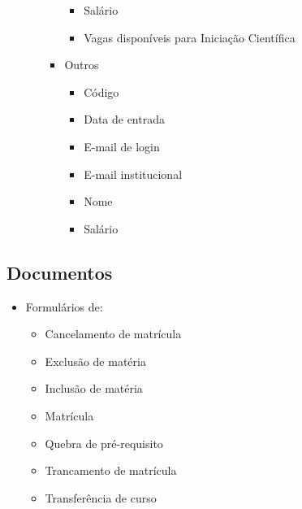 \begin{itemize}
\begin{itemize}
\begin{itemize}
\begin{itemize}
                            \item Salário
                            \item Vagas disponíveis para Iniciação Científica
                        \end{itemize}
                        \item Outros
                        \begin{itemize}
                            \item Código
                            \item Data de entrada
                            \item E-mail de login
                            \item E-mail institucional
                            \item Nome
                            \item Salário
                        \end{itemize}
                    \end{itemize}
                \end{itemize}
            \end{itemize}
    
        \subsection{Documentos}
            \begin{itemize}
                \item Formulários de:
                \begin{itemize}
                    \item Cancelamento de matrícula
                    \item Exclusão de matéria
                    \item Inclusão de matéria
                    \item Matrícula
                    \item Quebra de pré-requisito
                    \item Trancamento de matrícula
                    \item Transferência de curso
                \end{itemize}
            \end{itemize}
    
